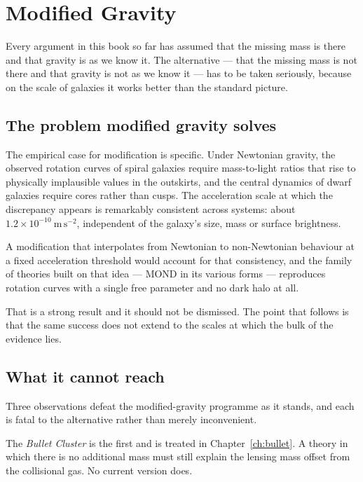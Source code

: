 
\chapter{Modified Gravity}
\label{ch:modified}

Every argument in this book so far has assumed that the missing mass is
there and that gravity is as we know it. The alternative --- that the
missing mass is not there and that gravity is not as we know it --- has to
be taken seriously, because on the scale of galaxies it works better than
the standard picture.

\section{The problem modified gravity solves}The empirical case for modification is
specific. Under Newtonian gravity, the observed rotation curves of spiral
galaxies require mass-to-light ratios that rise to physically implausible
values in the outskirts, and the central dynamics of dwarf galaxies require
cores rather than cusps. The acceleration scale at which the discrepancy
appears is remarkably consistent across systems: about
$1.2\times 10^{-10}\ \mathrm{m\,s}^{-2}$, independent of the galaxy's
size, mass or surface brightness.

A modification that interpolates from Newtonian to non-Newtonian behaviour at
a fixed acceleration threshold would account for that consistency, and the
family of theories built on that idea --- MOND in its various forms ---
reproduces rotation curves with a single free parameter and no dark halo at
all.

That is a strong result and it should not be dismissed. The point that
follows is that the same success does not extend to the scales at which the
bulk of the evidence lies.

\section{What it cannot reach}Three observations defeat the modified-gravity
programme as it stands, and each is fatal to the alternative rather than
merely inconvenient.

The \emph{Bullet Cluster} is the first and is treated in Chapter~\ref{ch:bullet}.
A theory in which there is no additional mass must still explain the
lensing mass offset from the collisional gas. No current version does.

